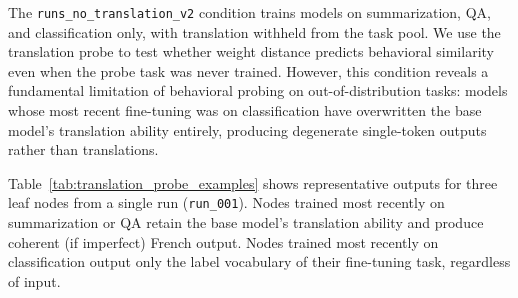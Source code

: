 \documentclass{article}
\theoremstyle{definition}
\theoremstyle{plain}
\begin{document}
The \texttt{runs\_no\_translation\_v2} condition trains models on summarization,
QA, and classification only, with translation withheld from the task pool. We use
the translation probe to test whether weight distance predicts behavioral similarity
even when the probe task was never trained. However, this condition reveals a
fundamental limitation of behavioral probing on out-of-distribution tasks: models
whose most recent fine-tuning was on classification have overwritten the base
model's translation ability entirely, producing degenerate single-token outputs
rather than translations.

Table~\ref{tab:translation_probe_examples} shows representative outputs for three
leaf nodes from a single run (\texttt{run\_001}). Nodes trained most recently on
summarization or QA retain the base model's translation ability and produce
coherent (if imperfect) French output. Nodes trained most recently on
classification output only the label vocabulary of their fine-tuning task,
regardless of input.
\end{document}
